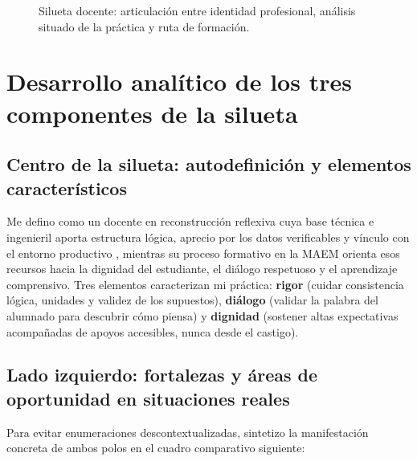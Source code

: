 \documentclass[spanish,letterpaper,oneside]{article}
\begin{document}
\begin{figure}[htbp]
\caption{Silueta docente: articulación entre identidad profesional, análisis situado de la práctica y ruta de formación.}
\label{fig:act2-silueta}
\end{figure}

\section{Desarrollo analítico de los tres componentes de la silueta}

\subsection*{Centro de la silueta: autodefinición y elementos característicos}
Me defino como un docente en reconstrucción reflexiva cuya base técnica e ingenieril aporta estructura lógica, aprecio por los datos verificables y vínculo con el entorno productivo \citep{conalep2025mecatronica}, mientras su proceso formativo en la MAEM orienta esos recursos hacia la dignidad del estudiante, el diálogo respetuoso y el aprendizaje comprensivo. Tres elementos caracterizan mi práctica: \textbf{rigor} (cuidar consistencia lógica, unidades y validez de los supuestos), \textbf{diálogo} (validar la palabra del alumnado para descubrir cómo piensa) y \textbf{dignidad} (sostener altas expectativas acompañadas de apoyos accesibles, nunca desde el castigo).

\subsection*{Lado izquierdo: fortalezas y áreas de oportunidad en situaciones reales}
Para evitar enumeraciones descontextualizadas, sintetizo la manifestación concreta de ambos polos en el cuadro comparativo siguiente:
\end{document}
